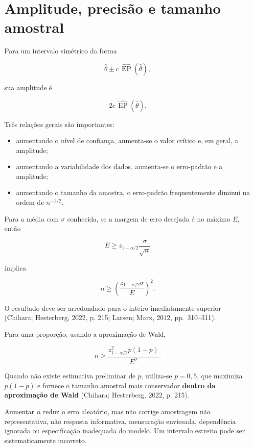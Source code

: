 \documentclass[
  letterpaper,
  DIV=11,
  numbers=noendperiod]{scrreprt}
\providecommand{\tightlist}{%
  \setlength{\itemsep}{0pt}\setlength{\parskip}{0pt}}\usepackage{longtable,booktabs,array}
\begin{document}
\section{Amplitude, precisão e tamanho
amostral}\label{amplitude-precisuxe3o-e-tamanho-amostral}

Para um intervalo simétrico da forma

\[\widehat\theta\pm c\,\widehat{\operatorname{EP}}(\widehat\theta),\]

sua amplitude é

\[2c\,\widehat{\operatorname{EP}}(\widehat\theta).\]

Três relações gerais são importantes:

\begin{itemize}
\tightlist
\item
  aumentando o nível de confiança, aumenta-se o valor crítico e, em
  geral, a amplitude;
\item
  aumentando a variabilidade dos dados, aumenta-se o erro-padrão e a
  amplitude;
\item
  aumentando o tamanho da amostra, o erro-padrão frequentemente diminui
  na ordem de \(n^{-1/2}\).
\end{itemize}

Para a média com \(\sigma\) conhecida, se a margem de erro desejada é no
máximo \(E\), então

\[E\geq z_{1-\alpha/2}\frac{\sigma}{\sqrt n}\]

implica

\[\boxed{
n\geq
\left(
\frac{z_{1-\alpha/2}\sigma}{E}
\right)^2
}.\]

O resultado deve ser arredondado para o inteiro imediatamente superior
(Chihara; Hesterberg, 2022, p. 215; Larsen; Marx, 2012, pp.~310--311).

Para uma proporção, usando a aproximação de Wald,

\[n\geq
\frac{z_{1-\alpha/2}^2p(1-p)}{E^2}.\]

Quando não existe estimativa preliminar de \(p\), utiliza-se
\(p=0{,}5\), que maximiza \(p(1-p)\) e fornece o tamanho amostral mais
conservador \textbf{dentro da aproximação de Wald} (Chihara; Hesterberg,
2022, p. 215).

\begin{tcolorbox}[enhanced jigsaw, colback=white, leftrule=.75mm, colbacktitle=quarto-callout-warning-color!10!white, breakable, titlerule=0mm, bottomtitle=1mm, title=\textcolor{quarto-callout-warning-color}{\faExclamationTriangle}\hspace{0.5em}{Precisão não elimina viés}, colframe=quarto-callout-warning-color-frame, toprule=.15mm, opacityback=0, bottomrule=.15mm, opacitybacktitle=0.6, arc=.35mm, toptitle=1mm, rightrule=.15mm, coltitle=black, left=2mm]

Aumentar \(n\) reduz o erro aleatório, mas não corrige amostragem não
representativa, não resposta informativa, mensuração enviesada,
dependência ignorada ou especificação inadequada do modelo. Um intervalo
estreito pode ser sistematicamente incorreto.

\end{tcolorbox}
\end{document}
